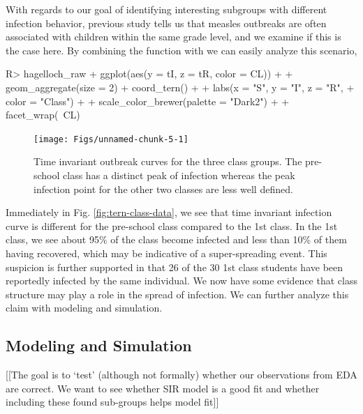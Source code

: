 \documentclass[
  shortnames]{jss}
\begin{document}
With regards to our goal of identifying interesting subgroups with
different infection behavior, previous study tells us that measles
outbreaks are often associated with children within the same grade
level, and we examine if this is the case here. By combining the
 function  with  we
can easily analyze this scenario,

\begin{CodeChunk}
\begin{CodeInput}
R> hagelloch_raw %
+   ggplot(aes(y = tI, z = tR, color = CL)) +
+   geom_aggregate(size = 2) + coord_tern() +
+   labs(x = "S", y = "I", z = "R",
+        color = "Class") +
+   scale_color_brewer(palette = "Dark2") +
+   facet_wrap(~CL)
\end{CodeInput}
\begin{figure}[H]

{\centering \texttt{[image: Figs/unnamed-chunk-5-1]} 

}

\caption{\label{fig:tern-class-data}Time invariant outbreak curves for the three class groups.  The pre-school class has a distinct peak of infection whereas the peak infection point for the other two classes are less well defined.}\label{fig:unnamed-chunk-5}
\end{figure}
\end{CodeChunk}

Immediately in Fig. \ref{fig:tern-class-data}, we see that time
invariant infection curve is different for the pre-school class compared
to the 1st class. In the 1st class, we see about 95\% of the class
become infected and less than 10\% of them having recovered, which may
be indicative of a super-spreading event. This suspicion is further
supported in that 26 of the 30 1st class students have been reportedly
infected by the same individual. We now have some evidence that class
structure may play a role in the spread of infection. We can further
analyze this claim with modeling and simulation.

\hypertarget{modeling-and-simulation}{%
\subsection{Modeling and Simulation}\label{modeling-and-simulation}}

{[}{[}The goal is to `test' (although not formally) whether our
observations from EDA are correct. We want to see whether SIR model is a
good fit and whether including these found sub-groups helps model
fit{]}{]}
\end{document}
